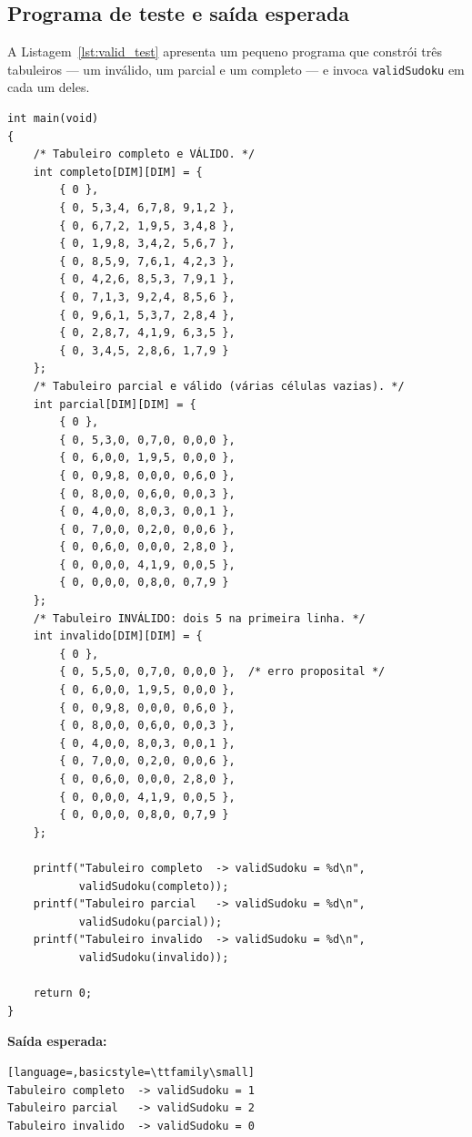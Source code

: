 \documentclass[11pt,a4paper,oneside]{report}
\newcommand{\codigo}[1]{\texttt{\color{deitelblue}#1}}
\begin{document}
\subsection{Programa de teste e saída esperada}

A Listagem~\ref{lst:valid_test} apresenta um pequeno programa que constrói
três tabuleiros --- um inválido, um parcial e um completo --- e invoca
\codigo{validSudoku} em cada um deles.

\begin{lstlisting}[caption={Programa de teste para \texttt{validSudoku}.},label={lst:valid_test}]
int main(void)
{
    /* Tabuleiro completo e VÁLIDO. */
    int completo[DIM][DIM] = {
        { 0 },
        { 0, 5,3,4, 6,7,8, 9,1,2 },
        { 0, 6,7,2, 1,9,5, 3,4,8 },
        { 0, 1,9,8, 3,4,2, 5,6,7 },
        { 0, 8,5,9, 7,6,1, 4,2,3 },
        { 0, 4,2,6, 8,5,3, 7,9,1 },
        { 0, 7,1,3, 9,2,4, 8,5,6 },
        { 0, 9,6,1, 5,3,7, 2,8,4 },
        { 0, 2,8,7, 4,1,9, 6,3,5 },
        { 0, 3,4,5, 2,8,6, 1,7,9 }
    };
    /* Tabuleiro parcial e válido (várias células vazias). */
    int parcial[DIM][DIM] = {
        { 0 },
        { 0, 5,3,0, 0,7,0, 0,0,0 },
        { 0, 6,0,0, 1,9,5, 0,0,0 },
        { 0, 0,9,8, 0,0,0, 0,6,0 },
        { 0, 8,0,0, 0,6,0, 0,0,3 },
        { 0, 4,0,0, 8,0,3, 0,0,1 },
        { 0, 7,0,0, 0,2,0, 0,0,6 },
        { 0, 0,6,0, 0,0,0, 2,8,0 },
        { 0, 0,0,0, 4,1,9, 0,0,5 },
        { 0, 0,0,0, 0,8,0, 0,7,9 }
    };
    /* Tabuleiro INVÁLIDO: dois 5 na primeira linha. */
    int invalido[DIM][DIM] = {
        { 0 },
        { 0, 5,5,0, 0,7,0, 0,0,0 },  /* erro proposital */
        { 0, 6,0,0, 1,9,5, 0,0,0 },
        { 0, 0,9,8, 0,0,0, 0,6,0 },
        { 0, 8,0,0, 0,6,0, 0,0,3 },
        { 0, 4,0,0, 8,0,3, 0,0,1 },
        { 0, 7,0,0, 0,2,0, 0,0,6 },
        { 0, 0,6,0, 0,0,0, 2,8,0 },
        { 0, 0,0,0, 4,1,9, 0,0,5 },
        { 0, 0,0,0, 0,8,0, 0,7,9 }
    };

    printf("Tabuleiro completo  -> validSudoku = %d\n",
           validSudoku(completo));
    printf("Tabuleiro parcial   -> validSudoku = %d\n",
           validSudoku(parcial));
    printf("Tabuleiro invalido  -> validSudoku = %d\n",
           validSudoku(invalido));

    return 0;
}
\end{lstlisting}

\textbf{Saída esperada:}
\begin{lstlisting}[language=,basicstyle=\ttfamily\small]
Tabuleiro completo  -> validSudoku = 1
Tabuleiro parcial   -> validSudoku = 2
Tabuleiro invalido  -> validSudoku = 0
\end{lstlisting}
\end{document}
